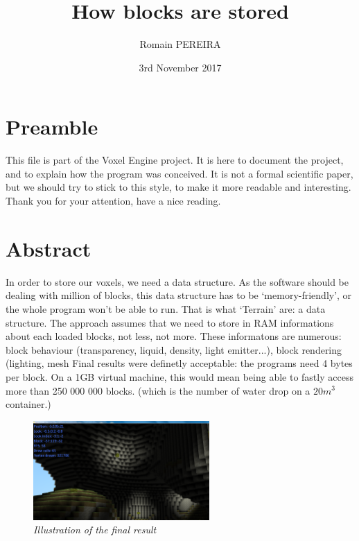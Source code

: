 \documentclass[11pt]{article}
\title{How blocks are stored}
\author{Romain PEREIRA}
\date{3rd November 2017}
\begin{document}
	\maketitle
	\tableofcontents

	\section*{Preamble}
	This file is part of the Voxel Engine project. It is here to document the project, and to explain how the program was conceived.
	It is not a formal scientific paper, but we should try to stick to this style, to make it more readable and interesting.
	Thank you for your attention, have a nice reading.
	\newpage
	
	\section{Abstract}
	In order to store our voxels, we need a data structure.
	As the software should be dealing with million of blocks, this data structure has to be `memory-friendly', or the whole program won't be able to run.
	That is what `Terrain' are: a data structure.
	\newline
	The approach assumes that we need to store in RAM informations about each loaded blocks, not less, not more.
	These informatons are numerous: block behaviour (transparency, liquid, density, light emitter...), block rendering (lighting, mesh
	\newline
	Final results were definetly acceptable: the programs need 4 bytes per block.
	On a 1GB virtual machine, this would mean being able to fastly access more than 250 000 000 blocks.
	(which is the number of water drop on a $20m^3$ container.)
	\begin{figure}[!h]
		\begin{center}
			\includegraphics[width=0.6\textwidth,height=0.6\textheight,keepaspectratio]{./assets/title.png}
		\end{center}
		\caption{\textit{Illustration of the final result}}
		\label{Title illustration}
	\end{figure}
	\newpage
\end{document}
